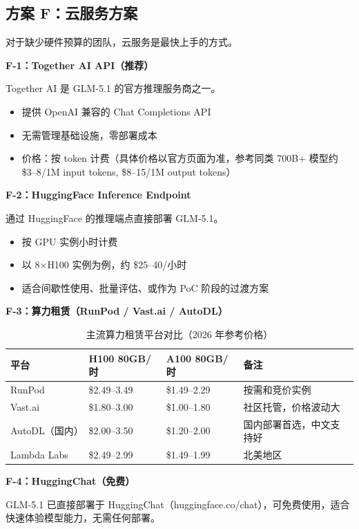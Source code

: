 \documentclass[UTF8,a4paper,10pt,oneside]{ctexart}
\begin{document}
\subsection{方案 F：云服务方案}

对于缺少硬件预算的团队，云服务是最快上手的方式。

\textbf{F-1：Together AI API（推荐）}

Together AI 是 GLM-5.1 的官方推理服务商之一。
\begin{itemize}
    \item 提供 OpenAI 兼容的 Chat Completions API
    \item 无需管理基础设施，零部署成本
    \item 价格：按 token 计费（具体价格以官方页面为准，参考同类 700B+ 模型约 \$3--8/1M input tokens, \$8--15/1M output tokens）
\end{itemize}

\textbf{F-2：HuggingFace Inference Endpoint}

通过 HuggingFace 的推理端点直接部署 GLM-5.1。
\begin{itemize}
    \item 按 GPU 实例小时计费
    \item 以 8$\times$H100 实例为例，约 \$25--40/小时
    \item 适合间歇性使用、批量评估、或作为 PoC 阶段的过渡方案
\end{itemize}

\textbf{F-3：算力租赁（RunPod / Vast.ai / AutoDL）}

\begin{table}[htbp]
\centering
\caption{主流算力租赁平台对比（2026 年参考价格）}
\begin{tabular}{p{2.5cm}p{2.5cm}p{2.5cm}p{4cm}}
\hline
\textbf{平台} & \textbf{H100 80GB/时} & \textbf{A100 80GB/时} & \textbf{备注} \\
\hline
RunPod & \$2.49--3.49 & \$1.49--2.29 & 按需和竞价实例 \\
Vast.ai & \$1.80--3.00 & \$1.00--1.80 & 社区托管，价格波动大 \\
AutoDL（国内） & \$2.00--3.50 & \$1.20--2.00 & 国内部署首选，中文支持好 \\
Lambda Labs & \$2.49--2.99 & \$1.49--1.99 & 北美地区 \\
\hline
\end{tabular}
\end{table}

\textbf{F-4：HuggingChat（免费）}

GLM-5.1 已直接部署于 HuggingChat（huggingface.co/chat），可免费使用，适合快速体验模型能力，无需任何部署。
\end{document}
